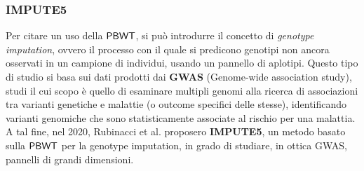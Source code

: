 \subsubsection{IMPUTE5}
Per citare un uso della $\mbox{\rm {\sf PBWT}}$, si può introdurre il concetto di
\textit{genotype 
  imputation}, ovvero il processo con il quale si predicono genotipi non ancora
osservati in un campione di individui, usando un pannello di aplotipi. Questo
tipo di studio si basa sui dati prodotti dai \textbf{GWAS} (Genome-wide
    association study), studi il cui scopo è quello di esaminare multipli
genomi alla ricerca di associazioni tra varianti genetiche e malattie (o
outcome specifici delle stesse), identificando varianti genomiche che sono
statisticamente associate al rischio per una malattia.\\ 
A tal fine, nel 2020, Rubinacci et al. \cite{impute5} proposero
\textbf{IMPUTE5}, un metodo basato sulla $\mbox{\rm {\sf PBWT}}$ per la genotype 
  imputation, in grado di studiare, in ottica GWAS, pannelli di grandi
  dimensioni. 
